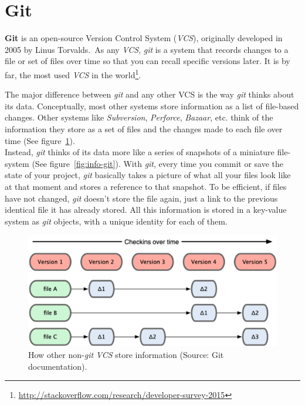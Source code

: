 \documentclass[a4paper, 12pt]{book}
\begin{document}
\section{Git}
\label{sec:git}
\textbf{Git} is an open-source Version Control System (\emph{VCS}), originally developed in 2005 by Linus Torvalds.\
As any \emph{VCS}, \emph{git} is a system that records changes to a file or set of files over time
so that you can recall specific versions later.
It is by far, the most used \emph{VCS} in the world\footnote{\url{http://stackoverflow.com/research/developer-survey-2015}}.\par
The major difference between \emph{git} and any other VCS is the way \emph{git} thinks about its data.
Conceptually, most other systems store information as a list of file-based changes. Other systems like \textit{Subversion},
\textit{Perforce}, \textit{Bazaar}, etc. think of the information they store as a set of files and the changes made to each
file over time (See figure~\ref{fig:info-not-git}).\\
Instead, \emph{git} thinks of its data more like a series of snapshots of a miniature file-system (See figure~\ref{fig:info-git}).
With \emph{git}, every time you commit or save the state of your project, \emph{git} basically takes a picture of what all
your files look like at that moment and stores a reference to that snapshot. To be efficient, if files have not changed,
\emph{git} doesn't store the file again, just a link to the previous identical file it has already stored.
All this information is stored in a key-value system as \emph{git} objects, with a unique identity for each of them.
\begin{figure}
  \centering
  \includegraphics[width=12cm, keepaspectratio]{img/deltas-not-git}
  \caption{How other non-\emph{git} \emph{VCS} store information (Source: Git documentation).}
  \label{fig:info-not-git}
\end{figure}
\end{document}
